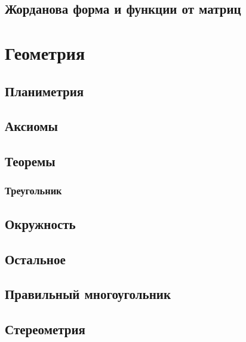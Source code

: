\subsection{Жорданова форма и функции от матриц}


\section{Геометрия}

\subsection{Планиметрия}

\subsection{Аксиомы}

\subsection{Теоремы}

\subsubsection{Треугольник}

\subsection{Окружность}

\subsection{Остальное}

\subsection{Правильный многоугольник}

\subsection{Стереометрия}